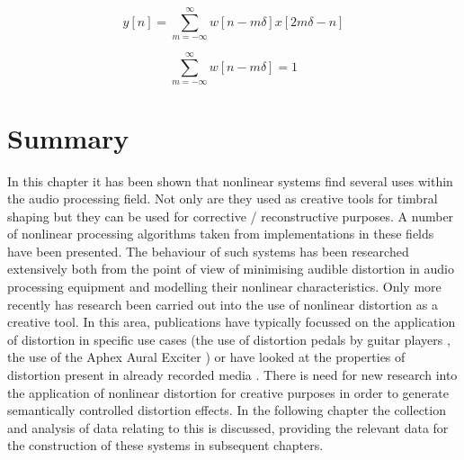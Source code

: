 		\begin{equation}
			y[n] = \sum_{m = -\infty}^{\infty} w[n - m\delta]x[2m\delta - n]
			\label{eq:STTR}
		\end{equation}

		\begin{equation}
			\sum_{m = -\infty}^{\infty} w[n - m\delta] = 1
			\label{eq:ConstantOverlapAdd}
		\end{equation}

\section{Summary}
\label{sec:Excitation-Summary}
	In this chapter it has been shown that nonlinear systems find several uses within the audio processing field. Not
	only are they used as creative tools for timbral shaping but they can be used for corrective / reconstructive
	purposes. A number of nonlinear processing algorithms taken from implementations in these fields have been
	presented. The behaviour of such systems has been researched extensively both from the point of view of minimising
	audible distortion in audio processing equipment and modelling their nonlinear characteristics. Only more recently
	has research been carried out into the use of nonlinear distortion as a creative tool. In this area, publications
	have typically focussed on the application of distortion in specific use cases (the use of distortion pedals by
	guitar players \citep{tsumoto2016the}, the use of the Aphex Aural Exciter \citep{shekar2013modeling}) or have
	looked at the properties of distortion present in already recorded media \citep{wilson2014characterisation}. There
	is need for new research into the application of nonlinear distortion for creative purposes in order to generate
	semantically controlled distortion effects. In the following chapter the collection and analysis of data relating
	to this is discussed, providing the relevant data for the construction of these systems in subsequent chapters.
